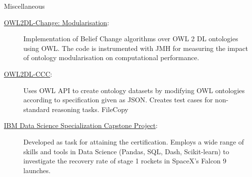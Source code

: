 \begin{rSection}{Miscellaneous}
\begin{description}
{\begin{description}
                \item[]
                \item[\href{https://gitlab.com/rfguimaraes/owl-change}{OWL2DL-Change: Modularisation}:] Implementation of Belief Change algorithms over OWL 2 DL ontologies using OWL. The code is instrumented with JMH for measuring the impact of ontology modularisation on computational performance.
                \item[\href{https://gitlab.com/rfguimaraes/owl2dl-ccc}{OWL2DL-CCC}:] Uses OWL API to create ontology datasets by modifying OWL ontologies according to specification given as JSON. Creates test cases for non-standard reasoning tasks.
     FileCopy   \item[\href{https://github.com/rfguimaraes/DataScienceCapstone}{IBM Data Science Specialization Capstone Project}:] Developed as task for attaining the certification. Employs a wide range of skills and tools in Data Science (Pandas, SQL, Dash, Scikit-learn) to investigate the recovery rate of stage 1 rockets in SpaceX's Falcon 9 launches.
            \end{description}
        }
    \end{description} 
\end{rSection}
